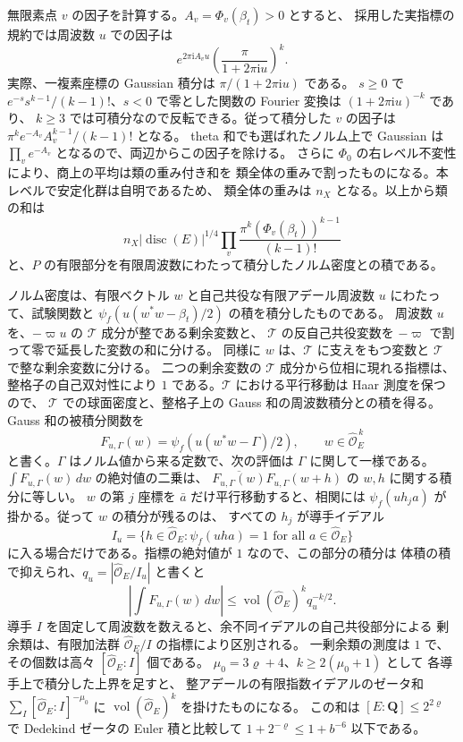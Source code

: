 無限素点 \(v\) の因子を計算する。\(A_v=\Phi_v(\beta_t)>0\) とすると、
採用した実指標の規約では周波数 \(u\) での因子は
\[
 e^{2\pi\mathrm i A_v u}
       \left(\frac{\pi}{1+2\pi\mathrm i u}\right)^k .
\]
実際、一複素座標の Gaussian 積分は \(\pi/(1+2\pi\mathrm i u)\) である。
\(s\ge0\) で \(e^{-s}s^{k-1}/(k-1)!\)、\(s<0\) で零とした関数の
Fourier 変換は \((1+2\pi\mathrm i u)^{-k}\) であり、
\(k\ge3\) では可積分なので反転できる。従って積分した \(v\) の因子は
\(\pi^k e^{-A_v}A_v^{k-1}/(k-1)!\) となる。
theta 和でも選ばれたノルム上で Gaussian は \(\prod_v e^{-A_v}\)
となるので、両辺からこの因子を除ける。
さらに \(\Phi_0\) の右レベル不変性により、商上の平均は類の重み付き和を
類全体の重みで割ったものになる。本レベルで安定化群は自明であるため、
類全体の重みは \(n_X\) となる。以上から類の和は
\[
 n_X|\operatorname{disc}(E)|^{1/4}
       \prod_v\frac{\pi^k(\Phi_v(\beta_t))^{k-1}}{(k-1)!}
\]
と、\(P\) の有限部分を有限周波数にわたって積分したノルム密度との積である。

ノルム密度は、有限ベクトル \(w\) と自己共役な有限アデール周波数 \(u\)
にわたって、試験関数と \(\psi_f(u(w^*w-\beta_t)/2)\) の積を積分したものである。
周波数 \(u\) を、\(-\varpi u\) の \(\mathcal T\) 成分が整である剰余変数と、
\(\mathcal T\) の反自己共役変数を \(-\varpi\) で割って零で延長した変数の和に分ける。
同様に \(w\) は、\(\mathcal T\) に支えをもつ変数と
\(\mathcal T\) で整な剰余変数に分ける。
二つの剰余変数の \(\mathcal T\) 成分から位相に現れる指標は、整格子の自己双対性により
\(1\) である。\(\mathcal T\) における平行移動は Haar 測度を保つので、
\(\mathcal T\) での球面密度と、整格子上の Gauss 和の周波数積分との積を得る。
Gauss 和の被積分関数を
\[
 F_{u,\Gamma}(w)=\psi_f\!\left(u(w^*w-\Gamma)/2\right),
 \qquad w\in\widehat{\mathcal O}_E^{\,k}
\]
と書く。\(\Gamma\) はノルム値から来る定数で、次の評価は \(\Gamma\) に関して一様である。
\(\int F_{u,\Gamma}(w)\,dw\) の絶対値の二乗は、
\(\overline{F_{u,\Gamma}(w)}F_{u,\Gamma}(w+h)\) の \(w,h\) に関する積分に等しい。
\(w\) の第 \(j\) 座標を \(\bar a\) だけ平行移動すると、相関には
\(\psi_f(u h_j a)\) が掛かる。従って \(w\) の積分が残るのは、
すべての \(h_j\) が導手イデアル
\[
 I_u=\{h\in\widehat{\mathcal O}_E:
            \psi_f(uha)=1\text{ for all }a\in\widehat{\mathcal O}_E\}
\]
に入る場合だけである。指標の絶対値が \(1\) なので、この部分の積分は
体積の積で抑えられ、\(q_u=|\widehat{\mathcal O}_E/I_u|\) と書くと
\[
 \left|\int F_{u,\Gamma}(w)\,dw\right|
 \le \operatorname{vol}(\widehat{\mathcal O}_E)^k q_u^{-k/2}.
\]
導手 \(I\) を固定して周波数を数えると、余不同イデアルの自己共役部分による
剰余類は、有限加法群 \(\widehat{\mathcal O}_E/I\) の指標により区別される。
一剰余類の測度は \(1\) で、その個数は高々 \([\widehat{\mathcal O}_E:I]\) 個である。
\(\mu_0=3\varrho+4\)、\(k\ge2(\mu_0+1)\) として
各導手上で積分した上界を足すと、
整アデールの有限指数イデアルのゼータ和
\(\sum_I[\widehat{\mathcal O}_E:I]^{-\mu_0}\)
に \(\operatorname{vol}(\widehat{\mathcal O}_E)^k\) を掛けたものになる。
この和は \([E:\mathbf Q]\le 2^{2\varrho}\) で Dedekind ゼータの
Euler 積と比較して \(1+2^{-\varrho}\le1+b^{-6}\) 以下である。

